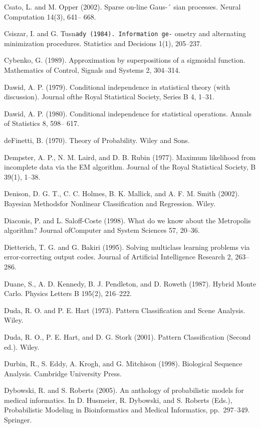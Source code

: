 \documentclass[
  10
]{article}
\begin{document}
Csato, L. and M. Opper (2002). Sparse on-line Gaus-´ sian processes.
Neural Computation 14(3), 641-- 668.

Csiszar, I. and G. Tusn\texttt{ady\ (1984).\ Information\ ge-} ometry
and alternating minimization procedures. Statistics and Decisions 1(1),
205--237.

Cybenko, G. (1989). Approximation by superpositions of a sigmoidal
function. Mathematics of Control, Signals and Systems 2, 304--314.

Dawid, A. P. (1979). Conditional independence in statistical theory
(with discussion). Journal ofthe Royal Statistical Society, Series B 4,
1--31.

Dawid, A. P. (1980). Conditional independence for statistical
operations. Annals of Statistics 8, 598-- 617.

deFinetti, B. (1970). Theory of Probability. Wiley and Sons.

Dempster, A. P., N. M. Laird, and D. B. Rubin (1977). Maximum likelihood
from incomplete data via the EM algorithm. Journal of the Royal
Statistical Society, B 39(1), 1--38.

Denison, D. G. T., C. C. Holmes, B. K. Mallick, and A. F. M. Smith
(2002). Bayesian Methodsfor Nonlinear Classification and Regression.
Wiley.

Diaconis, P. and L. Saloff-Coste (1998). What do we know about the
Metropolis algorithm? Journal ofComputer and System Sciences 57, 20--36.

Dietterich, T. G. and G. Bakiri (1995). Solving multiclass learning
problems via error-correcting output codes. Journal of Artificial
Intelligence Research 2, 263--286.

Duane, S., A. D. Kennedy, B. J. Pendleton, and D. Roweth (1987). Hybrid
Monte Carlo. Physics Letters B 195(2), 216--222.

Duda, R. O. and P. E. Hart (1973). Pattern Classification and Scene
Analysis. Wiley.

Duda, R. O., P. E. Hart, and D. G. Stork (2001). Pattern Classification
(Second ed.). Wiley.

Durbin, R., S. Eddy, A. Krogh, and G. Mitchison (1998). Biological
Sequence Analysis. Cambridge University Press.

Dybowski, R. and S. Roberts (2005). An anthology of probabilistic models
for medical informatics. In D. Husmeier, R. Dybowski, and S. Roberts
(Eds.), Probabilistic Modeling in Bioinformatics and Medical
Informatics, pp.~297--349. Springer.
\end{document}
